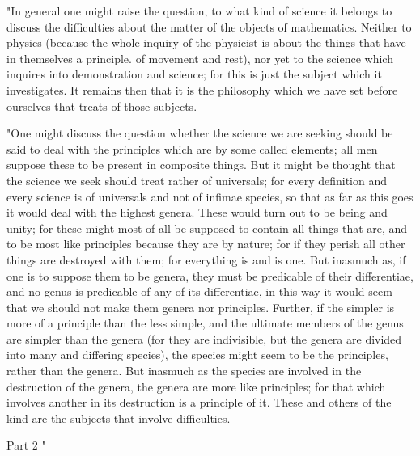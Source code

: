 "In general one might raise the question, to what kind of science
it belongs to discuss the difficulties about the matter of the objects
of mathematics. Neither to physics (because the whole inquiry of the
physicist is about the things that have in themselves a principle.
of movement and rest), nor yet to the science which inquires into
demonstration and science; for this is just the subject which it investigates.
It remains then that it is the philosophy which we have set before
ourselves that treats of those subjects. 

"One might discuss the question whether the science we are seeking
should be said to deal with the principles which are by some called
elements; all men suppose these to be present in composite things.
But it might be thought that the science we seek should treat rather
of universals; for every definition and every science is of universals
and not of infimae species, so that as far as this goes it would deal
with the highest genera. These would turn out to be being and unity;
for these might most of all be supposed to contain all things that
are, and to be most like principles because they are by nature; for
if they perish all other things are destroyed with them; for everything
is and is one. But inasmuch as, if one is to suppose them to be genera,
they must be predicable of their differentiae, and no genus is predicable
of any of its differentiae, in this way it would seem that we should
not make them genera nor principles. Further, if the simpler is more
of a principle than the less simple, and the ultimate members of the
genus are simpler than the genera (for they are indivisible, but the
genera are divided into many and differing species), the species might
seem to be the principles, rather than the genera. But inasmuch as
the species are involved in the destruction of the genera, the genera
are more like principles; for that which involves another in its destruction
is a principle of it. These and others of the kind are the subjects
that involve difficulties. 

Part 2 "

